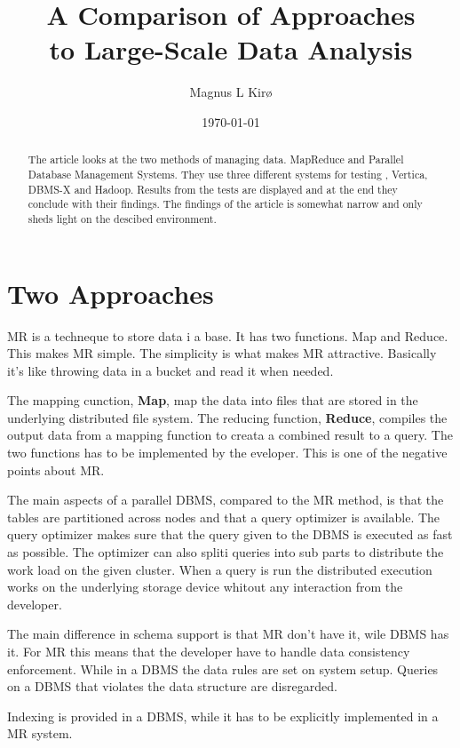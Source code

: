 \documentclass[11pt, a4paper]{article}
\title{A Comparison of Approaches \\ to Large-Scale Data Analysis}
\author{
        Magnus L Kirø 
}
\date{\today}
\begin{document}
\maketitle
{}

\begin{abstract}
The article looks at the two methods of managing data. MapReduce and Parallel Database Management Systems. 
They use three different systems for testing , Vertica, DBMS-X and Hadoop. 
Results from the tests are displayed and at the end they conclude with their findings. 
The findings of the article is somewhat narrow and only sheds light on the descibed environment.  
\end{abstract}

\section{Two Approaches} %
MR is a techneque to store data i a base. It has two functions. Map and Reduce. 
This makes MR simple. The simplicity is what makes MR attractive. 
Basically it's like throwing data in a bucket and read it when needed. 

The mapping cunction, \textbf{Map}, map the data into files that are stored in the underlying distributed file system. 
The reducing function, \textbf{Reduce}, compiles the output data from a mapping function to creata a combined result to a query. 
The two functions has to be implemented by the eveloper. This is one of the negative points about MR. 

The main aspects of a parallel DBMS, compared to the MR method, is that the tables are partitioned across nodes and that a query optimizer is available. 
The query optimizer makes sure that the query given to the DBMS is executed as fast as possible. 
The optimizer can also spliti queries into sub parts to distribute the work load on the given cluster. 
When a query is run the distributed execution works on the underlying storage device whitout any interaction from the developer. 

The main difference in schema support is that MR don't have it, wile DBMS has it. For MR this means that the developer have to handle data consistency enforcement. While in a DBMS the data rules are set on system setup. Queries on a DBMS that violates the data structure are disregarded. 

Indexing is provided in a DBMS, while it has to be explicitly implemented in a MR system. 
\end{document}
